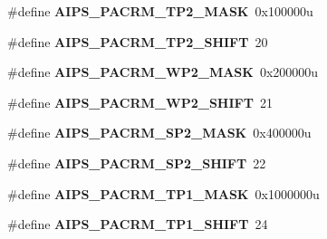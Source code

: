 \begin{DoxyCompactItemize}
\item 
\hypertarget{group___a_i_p_s___register___masks_gad15af493ee1cb5349eb13c39a0f8aaf4}{}\#define {\bfseries A\+I\+P\+S\+\_\+\+P\+A\+C\+R\+M\+\_\+\+T\+P2\+\_\+\+M\+A\+S\+K}~0x100000u\label{group___a_i_p_s___register___masks_gad15af493ee1cb5349eb13c39a0f8aaf4}

\item 
\hypertarget{group___a_i_p_s___register___masks_gac3e6b0078d445ab5ccef3399bb7d2080}{}\#define {\bfseries A\+I\+P\+S\+\_\+\+P\+A\+C\+R\+M\+\_\+\+T\+P2\+\_\+\+S\+H\+I\+F\+T}~20\label{group___a_i_p_s___register___masks_gac3e6b0078d445ab5ccef3399bb7d2080}

\item 
\hypertarget{group___a_i_p_s___register___masks_gad7134b017c58391217c18adcf22193b7}{}\#define {\bfseries A\+I\+P\+S\+\_\+\+P\+A\+C\+R\+M\+\_\+\+W\+P2\+\_\+\+M\+A\+S\+K}~0x200000u\label{group___a_i_p_s___register___masks_gad7134b017c58391217c18adcf22193b7}

\item 
\hypertarget{group___a_i_p_s___register___masks_gae090abb4397607dfbc9aed6a3f76196b}{}\#define {\bfseries A\+I\+P\+S\+\_\+\+P\+A\+C\+R\+M\+\_\+\+W\+P2\+\_\+\+S\+H\+I\+F\+T}~21\label{group___a_i_p_s___register___masks_gae090abb4397607dfbc9aed6a3f76196b}

\item 
\hypertarget{group___a_i_p_s___register___masks_gafd46aded4717f92367f67dcb6a2d9997}{}\#define {\bfseries A\+I\+P\+S\+\_\+\+P\+A\+C\+R\+M\+\_\+\+S\+P2\+\_\+\+M\+A\+S\+K}~0x400000u\label{group___a_i_p_s___register___masks_gafd46aded4717f92367f67dcb6a2d9997}

\item 
\hypertarget{group___a_i_p_s___register___masks_gabc851a97b4b79dcaea4dd6bb31eb4241}{}\#define {\bfseries A\+I\+P\+S\+\_\+\+P\+A\+C\+R\+M\+\_\+\+S\+P2\+\_\+\+S\+H\+I\+F\+T}~22\label{group___a_i_p_s___register___masks_gabc851a97b4b79dcaea4dd6bb31eb4241}

\item 
\hypertarget{group___a_i_p_s___register___masks_ga569fcf266897909dfb3772a44caed513}{}\#define {\bfseries A\+I\+P\+S\+\_\+\+P\+A\+C\+R\+M\+\_\+\+T\+P1\+\_\+\+M\+A\+S\+K}~0x1000000u\label{group___a_i_p_s___register___masks_ga569fcf266897909dfb3772a44caed513}

\item 
\hypertarget{group___a_i_p_s___register___masks_gafd96ab7fddfae6d60efd93e20fc5512c}{}\#define {\bfseries A\+I\+P\+S\+\_\+\+P\+A\+C\+R\+M\+\_\+\+T\+P1\+\_\+\+S\+H\+I\+F\+T}~24\label{group___a_i_p_s___register___masks_gafd96ab7fddfae6d60efd93e20fc5512c}


\end{DoxyCompactItemize}
